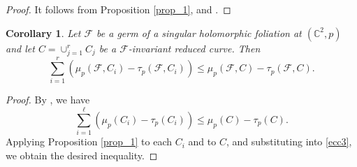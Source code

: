 \documentclass[11pt]{amsart}
\newcommand{\C}{\mathbb{C}}
\newcommand{\F}{\mathcal{F}}
\newtheorem{corollary}[theorem]{Corollary}
\begin{document}
\begin{proof} 
It follows from Proposition \ref{prop_1}, and \cite[Satz p.123, (a) and (d)]{Saito}.
\end{proof}
\begin{corollary}
Let $\F$ be a germ of a singular holomorphic foliation at $(\C^2,p)$ and let $C=\cup_{j=1}^{r}C_j$ be a $\F$-invariant reduced curve. Then 
\[\sum_{i=1}^{r}\left(\mu_p(\F,C_i)-\tau_p(\F,C_i)\right)\leq \mu_p(\F,C)-\tau_p(\F,C).\]
\end{corollary}
\begin{proof}
By \cite[Theorem 4.3]{H-H}, we have
\begin{equation}\label{ecc3}
\sum_{i=1}^{\ell}\left(\mu_p(C_i)-\tau_p(C_i)\right)\leq \mu_p(C)-\tau_p(C).
\end{equation}
Applying Proposition \ref{prop_1} to each $C_i$ and to $C$, and substituting into  \eqref{ecc3}, we obtain the desired inequality.
\end{proof}
\end{document}
